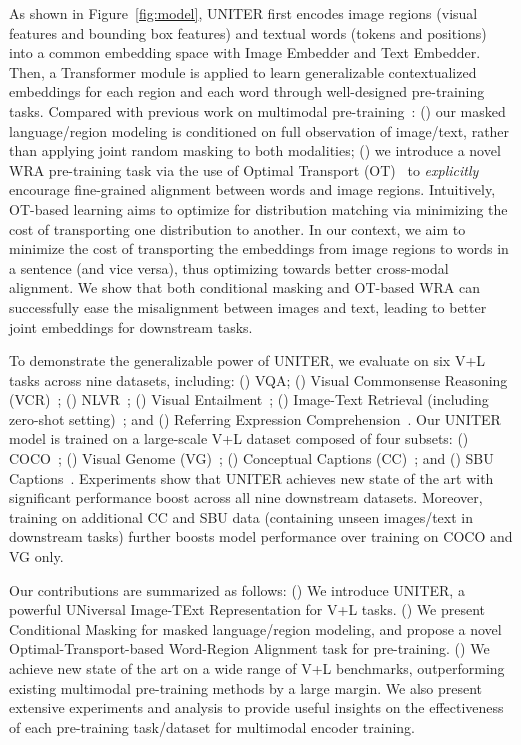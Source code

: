 \documentclass[runningheads]{llncs}
\begin{document}
As shown in Figure~\ref{fig:model}, UNITER first encodes image regions (visual features and bounding box features) and textual words (tokens and positions) into a common embedding space with Image Embedder and Text Embedder. Then, a Transformer module is applied to learn generalizable contextualized embeddings for each region and each word through well-designed pre-training tasks.
Compared with previous work on multimodal pre-training~\cite{tan2019lxmert,lu2019vilbert,alberti2019fusion,li2019unicoder,su2019vl,zhou2019unified,li2019visualbert}: () our masked language/region modeling is conditioned on full observation of image/text, rather than applying joint random masking to both modalities; () we introduce a novel WRA pre-training task via the use of Optimal Transport (OT)~\cite{peyre2019computational,chen2020graph} to \emph{explicitly} encourage fine-grained alignment between words and image regions. Intuitively, OT-based learning aims to optimize for distribution matching via minimizing the cost of transporting one distribution to another. In our context, we aim to minimize the cost of transporting the embeddings from image regions to words in a sentence (and vice versa), thus optimizing towards better cross-modal alignment.
We show that both conditional masking and OT-based WRA can successfully ease the misalignment between images and text, leading to better joint embeddings for downstream tasks. 


To demonstrate the generalizable power of UNITER, we evaluate on six V+L tasks across nine datasets,
including: 
() VQA;
() Visual Commonsense Reasoning (VCR)~\cite{zellers2019recognition}; () NLVR~\cite{suhr2018corpus}; 
() Visual Entailment~\cite{xie2019visual};
() Image-Text Retrieval (including zero-shot setting)~\cite{lee2018stacked};
and 
() Referring Expression Comprehension~\cite{yu2016modeling}.
Our UNITER model is trained on a large-scale V+L dataset composed of four subsets: () COCO~\cite{lin2014microsoft}; () Visual Genome (VG)~\cite{krishna2017visual}; () Conceptual Captions (CC)~\cite{sharma2018conceptual}; and () SBU Captions~\cite{ordonez2011im2text}. Experiments show that UNITER achieves new state of the art with significant performance boost across all nine downstream datasets. Moreover, training on additional CC and SBU data (containing unseen images/text in downstream tasks) further boosts model performance over training on COCO and VG only.

Our contributions are summarized as follows: 
() We introduce UNITER, a powerful UNiversal Image-TExt Representation for V+L tasks. 
() We present Conditional Masking for masked language/region modeling, and propose a novel Optimal-Transport-based Word-Region Alignment task for pre-training.
() We achieve new state of the art on a wide range of V+L benchmarks, outperforming existing multimodal pre-training methods by a large margin. 
We also present extensive experiments and analysis to provide useful insights on the effectiveness of each pre-training task/dataset for multimodal encoder training.
\end{document}
